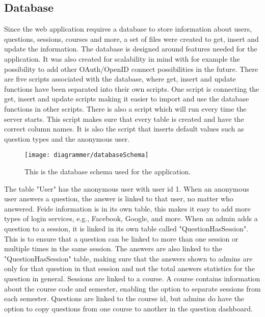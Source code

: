 \subsection{Database}
Since the web application requires a database to store information about users, questions, sessions, courses and more, a set of files were created to get, insert and update the information. The database is designed around features needed for the application. It was also created for scalability in mind with for example the possibility to add other OAuth/OpenID connect possibilities in the future. There are five scripts associated with the database, where get, insert and update functions have been separated into their own scripts. One script is connecting the get, insert and update scripts making it easier to import and use the database functions in other scripts. There is also a script which will run every time the server starts. This script makes sure that every table is created and have the correct column names. It is also the script that inserts default values such as question types and the anonymous user.
\begin{figure}[H]
    \centering
    \texttt{[image: diagrammer/databaseSchema]}
    \caption{This is the database schema used for the application.}
    \label{fig:dbSchema}
\end{figure}
\noindent
The table "User" has the anonymous user with user id 1. When an anonymous user answers a question, the answer is linked to that user, no matter who answered. Feide information is in its own table, this makes it easy to add more types of login services, e.g., Facebook, Google, and more. When an admin adds a question to a session, it is linked in its own table called "QuestionHasSession". This is to ensure that a question can be linked to more than one session or multiple times in the same session. The answers are also linked to the "QuestionHasSession" table, making sure that the answers shown to admins are only for that question in that session and not the total answers statistics for the question in general. Sessions are linked to a course. A course contains information about the course code and semester, enabling the option to separate sessions from each semester. Questions are linked to the course id, but admins do have the option to copy questions from one course to another in the question dashboard.